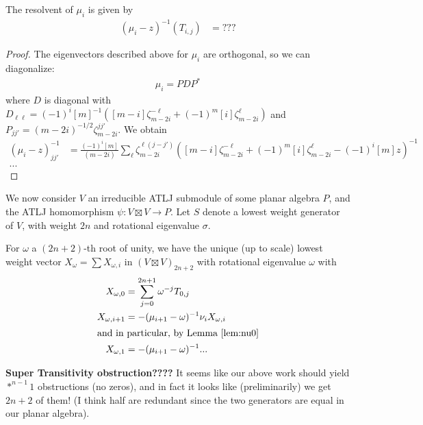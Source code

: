 \documentclass[12pt]{article}
\begin{document}
\begin{lem}
The resolvent of $\mu_i$ is given by
\begin{align*}
(\mu_i - z)^{-1}(T_{i,j}) & = ???
\end{align*}
\end{lem}
\begin{proof}
The eigenvectors described above for $\mu_i$ are orthogonal, so we can diagonalize:
\begin{align*}
\mu_i = P D P^*
\end{align*}
where $D$ is diagonal with 
$D_{\ell\ell} = (-1)^i [m]^{-1} \left([m-i] \zeta_{m-2i}^{-\ell} + (-1)^{m}[i] \zeta_{m-2i}^\ell\right)$ and
$P_{jj'} = (m-2i)^{-1/2} \zeta_{m-2i}^{jj'}$.
We obtain
\begin{align*}
(\mu_i - z)^{-1}_{jj'} & = \frac{(-1)^i [m]}{(m-2i)} \sum_{\ell} \zeta_{m-2i}^{\ell(j-j')}  \left([m-i] \zeta_{m-2i}^{-\ell} + (-1)^{m}[i] \zeta_{m-2i}^\ell - (-1)^i [m] z\right)^{-1} \\
...
\end{align*}
\end{proof}

We now consider $V$ an irreducible ATLJ submodule of some planar algebra $P$, and the ATLJ homomorphism $\psi: V\boxtimes V\rightarrow P$. Let $S$ denote a lowest weight generator of $V$, with weight $2n$ and rotational eigenvalue $\sigma$.

For $\omega$ a $(2n+2)$-th root of unity, we have the unique (up to scale) lowest weight vector $X_\omega = \sum X_{\omega,i}$ in $(V \boxtimes V)_{2n+2}$ with rotational eigenvalue $\omega$ with
\begin{align*}
X_{\omega,0} & = \sum_{j=0}^{2n+1} \omega^{-j} T_{0,j} \\
X_{\omega,i+1} & = - (\mu_{i+1} - \omega)^{-1} \nu_i X_{\omega,i} \\
\intertext{and in particular, by Lemma \ref{lem:nu0}}
X_{\omega,1} & = - (\mu_{i+1} - \omega)^{-1}  ...
\end{align*}

\textbf{Super Transitivity obstruction????} It seems like our above work should yield $*^{n-1}1$ obstructions (no zeros), and in fact it looks like (preliminarily) we get $2n+2$ of them! (I think half are redundant since the two generators are equal in our planar algebra).
\end{document}
